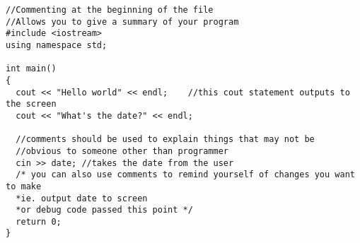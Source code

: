 \noindent\begin{minipage}{\linewidth}\begin{lstlisting}
//Commenting at the beginning of the file
//Allows you to give a summary of your program
#include <iostream>
using namespace std;

int main()
{
  cout << "Hello world" << endl; 	//this cout statement outputs to the screen
  cout << "What's the date?" << endl;

  //comments should be used to explain things that may not be 
  //obvious to someone other than programmer
  cin >> date; //takes the date from the user
  /* you can also use comments to remind yourself of changes you want to make
  *ie. output date to screen
  *or debug code passed this point */
  return 0;
}
\end{lstlisting}\end{minipage}


